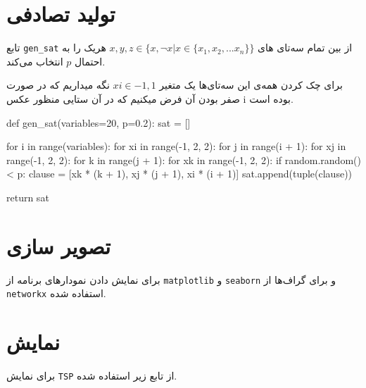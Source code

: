 \section{تولید  تصادفی}
تابع 
\verb;gen_sat;
از بین تمام سه‌تای های
$x, y, z \in \{x, \neg x | x \in \{x_1, x_2, ... x_n\}\}$
هریک را به احتمال
$p$
انتخاب می‌کند.

برای چک کردن همه‌ی این سه‌تای‌ها یک متغیر 
$xi \in {-1, 1}$
نگه میداریم که در صورت صفر بودن آن فرض میکنیم که در آن ستایی منظور عکس i بوده است.

\begin{latin}
\begin{python}
def gen_sat(variables=20, p=0.2):
    sat = []
    
    for i in range(variables):
        for xi in range(-1, 2, 2):
            for j in range(i + 1):
                for xj in range(-1, 2, 2):
                    for k in range(j + 1):
                        for xk in range(-1, 2, 2):
                                if random.random() < p:
                                    clause = [xk * (k + 1), xj * (j + 1), xi * (i + 1)]
                                    sat.append(tuple(clause))

    return sat

\end{python}
\end{latin}
 
 \section{تصویر سازی}
 برای نمایش دادن نمودارهای برنامه از
\verb;matplotlib;
و
\verb;seaborn;
 و برای گراف‌ها از
\verb;networkx;
استفاده شده.


\section{نمایش }

برای نمایش 
\verb;TSP;
از تابع زیر استفاده شده.

